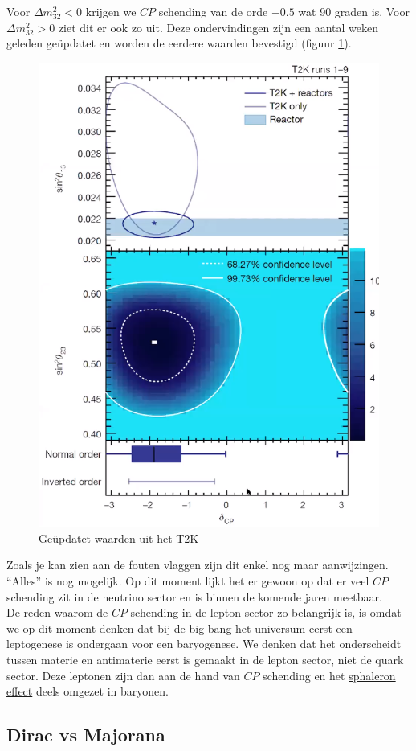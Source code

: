\documentclass[../main.tex]{subfiles}
\begin{document}
Voor $\Delta m_{32}^{2}<0$ krijgen we $CP$ schending van de orde $-0.5$ wat 90 graden is. Voor $\Delta m_{32}^{2}>0$ ziet dit er ook zo uit. Deze ondervindingen zijn een aantal weken geleden geüpdatet en worden de eerdere waarden bevestigd (figuur \ref{fig:neutrinos/t2k_update}).

\begin{figure}[h]
    \centering
    \includegraphics[width=0.4\linewidth]{neutrinos/t2k_update.png}
    \caption{Geüpdatet waarden uit het T2K}%
    \label{fig:neutrinos/t2k_update}
\end{figure}

Zoals je kan zien aan de fouten vlaggen zijn dit enkel nog maar aanwijzingen. ``Alles'' is nog mogelijk. Op dit moment lijkt het er gewoon op dat er veel $CP$ schending zit in de neutrino sector en is binnen de komende jaren meetbaar.\\
De reden waarom de $CP$ schending in de lepton sector zo belangrijk is, is omdat we op dit moment denken dat bij de big bang het universum eerst een leptogenese is ondergaan voor een baryogenese. We denken dat het onderscheidt tussen materie en antimaterie eerst is gemaakt in de lepton sector, niet de quark sector. Deze leptonen zijn dan aan de hand van $CP$ schending en het \href{https://en.wikipedia.org/wiki/Sphaleron}{sphaleron effect} deels omgezet in baryonen.

\subsection{Dirac vs Majorana}%
\label{sub:dirac_vs_majorana}
\end{document}

